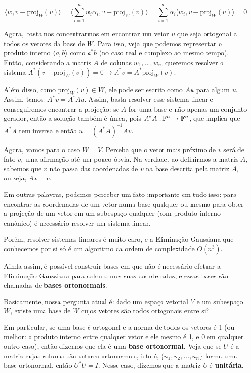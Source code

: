\documentclass[11pt, a4paper]{article}
\begin{document}
\void[-1]

\[\langle w,v-\text{proj}_W(v)\rangle = \langle \sum_{i=1}^{n}w_i\alpha_i,v-\text{proj}_W(v)\rangle = \sum_{i=1}^{n}\alpha_i\langle w_i,v-\text{proj}_W(v)\rangle=0\]

\void[-0.4]

Agora, basta nos concentrarmos em encontrar um vetor \(u\) que seja ortogonal a todos os vetores da base de \(W\). Para isso, veja que podemos representar o produto interno \(\langle a,b\rangle\) como \(a^*b\) (no caso real e complexo ao mesmo tempo). Então, considerando a matriz \(A\) de colunas \(w_1,...,w_n\), queremos resolver o sistema \(A^*(v-\text{proj}_W(v))=0 \rightarrow A^*v=A^*\text{proj}_W(v)\).

Além disso, como \(\text{proj}_W(v) \in W\), ele pode ser escrito como \(Au\) para algum \(u\). Assim, temos: \(A^*v=A^*Au\). Assim, basta resolver esse sistema linear e conseguiremos encontrar a projeção: se \(A\) for uma base e não apenas um conjunto gerador, então a solução também é única, pois \(A^*A:\mathbb{F}^n \rightarrow \mathbb{F}^n\), que implica que \(A^*A\) tem inversa e então \(u=(A^*A)^{-1}Av\).

Agora, vamos para o caso \(W=V\). Perceba que o vetor mais próximo de \(v\) será de fato \(v\), uma afirmação até um pouco óbvia. Na verdade, ao definirmos a matriz \(A\), sabemos que \(x\) não passa das coordenadas de \(v\) na base descrita pela matriz \(A\), ou seja, \(Ax=v\).

Em outras palavras, podemos perceber um fato importante em tudo isso: para encontrar as coordenadas de um vetor numa base qualquer ou mesmo para obter a projeção de um vetor em um subespaço qualquer (com produto interno canônico) é necessário resolver um sistema linear. 

Porém, resolver sistemas lineares é muito caro, e a Eliminação Gaussiana que conhecemos por si só é um algoritmo da ordem de complexidade \(O(n^3)\). 

Ainda assim, é possível construir bases em que não é necessário efetuar a Eliminação Gaussiana para calcularmos suas coordenadas, e essas bases são chamadas de \textbf{bases ortonormais}. 

Basicamente, nossa pergunta atual é: dado um espaço vetorial \(V\) e um subespaço \(W\), existe uma base de \(W\) cujos vetores são todos ortogonais entre si?

Em particular, se uma base é ortogonal e a norma de todos os vetores é 1 (ou melhor: o produto interno entre qualquer vetor e ele mesmo é 1, e 0 em qualquer outro caso), então dizemos que ela é uma \textbf{base ortonormal}. Veja que se \(U\) é a matriz cujas colunas são vetores ortonormais, isto é, \(\{u_1,u_2,...,u_n\}\) forma uma base ortonormal, então \(U^*U=I\). Nesse caso, dizemos que a matriz \(U\) é \textbf{unitária}. 
\end{document}

